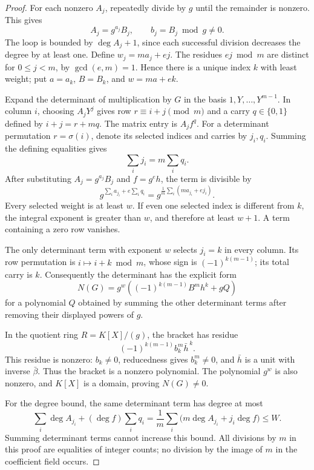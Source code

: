 \begin{proof}
For each nonzero \(A_j\), repeatedly divide by \(g\) until the remainder
is nonzero.  This gives
\[
 A_j=g^{a_j}B_j,\qquad b_j=B_j\bmod g\ne0.
\]
The loop is bounded by \(\deg A_j+1\), since each successful division
decreases the degree by at least one.  Define \(w_j=ma_j+ej\).
The residues \(ej\bmod m\) are distinct for \(0\leq j<m\), by
\(\gcd(e,m)=1\).  Hence there is a unique index \(k\) with least
weight; put \(a=a_k\), \(B=B_k\), and \(w=ma+ek\).

Expand the determinant of multiplication by \(G\) in the basis
\(1,Y,\ldots,Y^{m-1}\).  In column \(i\), choosing \(A_jY^j\)
gives row \(r\equiv i+j\pmod m\) and a carry \(q\in\{0,1\}\)
defined by
\(i+j=r+mq\).  The matrix entry is \(A_jf^q\).
For a determinant permutation \(r=\sigma(i)\), denote its selected
indices and carries by \(j_i,q_i\).  Summing the defining equalities
gives
\[
                    \sum_i j_i=m\sum_iq_i.
\]
After substituting \(A_j=g^{a_j}B_j\) and \(f=g^e h\), the term is
divisible by
\[
 g^{\sum_i a_{j_i}+e\sum_iq_i}
       =g^{\frac1m\sum_i(ma_{j_i}+ej_i)}.
\]
Every selected weight is at least \(w\).  If even one selected index is
different from \(k\), the integral exponent is greater than \(w\),
and therefore at least \(w+1\).  A term containing a zero row vanishes.

The only determinant term with exponent \(w\) selects \(j_i=k\)
in every column.  Its row permutation is \(i\mapsto i+k\bmod m\),
whose sign is \((-1)^{k(m-1)}\); its total carry is \(k\).
Consequently the determinant has the explicit form
\begin{equation}
 \label{eq:adic-norm-witness}
 N(G)=g^w\left((-1)^{k(m-1)}B^m h^k+gQ\right)
\end{equation}
for a polynomial \(Q\) obtained by summing the other determinant terms
after removing their displayed powers of \(g\).

In the quotient ring \(R=K[X]/(g)\), the bracket has residue
\[
                   (-1)^{k(m-1)}b_k^m\bar h^{\,k}.
\]
This residue is nonzero: \(b_k\ne0\), reducedness gives
\(b_k^m\ne0\), and \(\bar h\) is a unit with inverse \(\bar\beta\).
Thus the bracket is a nonzero polynomial.  The polynomial \(g^w\) is
also nonzero, and \(K[X]\) is a domain, proving \(N(G)\ne0\).

For the degree bound, the same determinant term has degree at most
\[
 \sum_i\deg A_{j_i}+(\deg f)\sum_iq_i
 =\frac1m\sum_i\bigl(m\deg A_{j_i}+j_i\deg f\bigr)\leq W.
\]
Summing determinant terms cannot increase this bound.
All divisions by \(m\) in this proof are equalities of integer counts;
no division by the image of \(m\) in the coefficient field occurs.
\end{proof}


